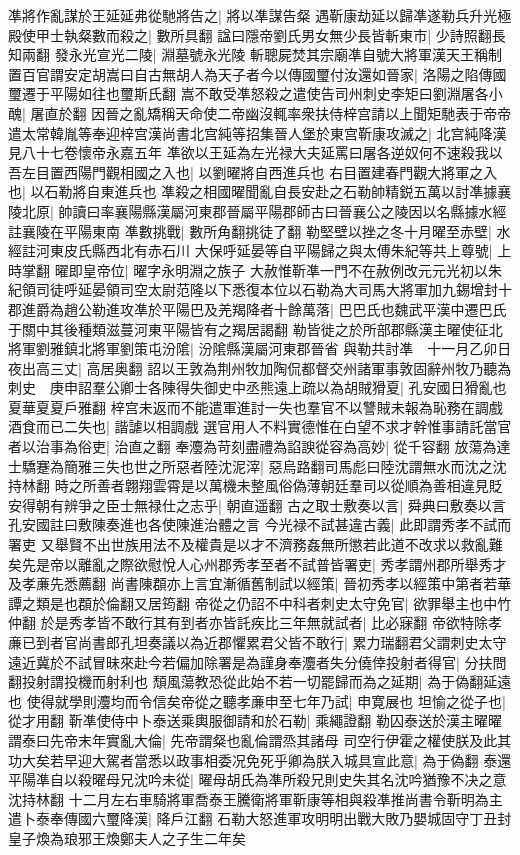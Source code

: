 凖將作亂謀於王延延弗從馳將告之|{
	將以凖謀告粲}
遇靳康劫延以歸凖遂勒兵升光極殿使甲士執粲數而殺之|{
	數所具翻}
諡曰隱帝劉氏男女無少長皆斬東市|{
	少詩照翻長知兩翻}
發永光宣光二陵|{
	淵墓號永光陵}
斬聰屍焚其宗廟凖自號大將軍漢天王稱制置百官謂安定胡嵩曰自古無胡人為天子者今以傳國璽付汝還如晉家|{
	洛陽之陷傳國璽遷于平陽如往也璽斯氏翻}
嵩不敢受凖怒殺之遣使告司州刺史李矩曰劉淵屠各小醜|{
	屠直於翻}
因晉之亂矯稱天命使二帝幽沒輒率衆扶侍梓宫請以上聞矩馳表于帝帝遣太常韓胤等奉迎梓宫漢尚書北宫純等招集晉人堡於東宫靳康攻滅之|{
	北宫純降漢見八十七卷懷帝永嘉五年}
凖欲以王延為左光禄大夫延罵曰屠各逆奴何不速殺我以吾左目置西陽門觀相國之入也|{
	以劉曜將自西進兵也}
右目置建春門觀大將軍之入也|{
	以石勒將自東進兵也}
凖殺之相國曜聞亂自長安赴之石勒帥精鋭五萬以討凖據襄陵北原|{
	帥讀曰率襄陽縣漢屬河東郡晉屬平陽郡師古曰晉襄公之陵因以名縣據水經註襄陵在平陽東南}
凖數挑戰|{
	數所角翻挑徒了翻}
勒堅壁以挫之冬十月曜至赤壁|{
	水經註河東皮氏縣西北有赤石川}
大保呼延晏等自平陽歸之與太傅朱紀等共上尊號|{
	上時掌翻}
曜即皇帝位|{
	曜字永明淵之族子}
大赦惟靳凖一門不在赦例改元元光初以朱紀領司徒呼延晏領司空太尉范隆以下悉復本位以石勒為大司馬大將軍加九錫增封十郡進爵為趙公勒進攻凖於平陽巴及羌羯降者十餘萬落|{
	巴巴氏也魏武平漢中遷巴氏于關中其後種類滋蔓河東平陽皆有之羯居謁翻}
勒皆徙之於所部郡縣漢主曜使征北將軍劉雅鎮北將軍劉策屯汾隂|{
	汾隂縣漢屬河東郡晉省}
與勒共討凖　十一月乙卯日夜出高三丈|{
	高居奥翻}
詔以王敦為荆州牧加陶侃都督交州諸軍事敦固辭州牧乃聽為刺史　庚申詔羣公卿士各陳得失御史中丞熊遠上疏以為胡賊猾夏|{
	孔安國日猾亂也夏華夏夏戶雅翻}
梓宫未返而不能遣軍進討一失也羣官不以讐賊未報為恥務在調戲酒食而已二失也|{
	諧謔以相調戲}
選官用人不料實德惟在白望不求才幹惟事請託當官者以治事為俗吏|{
	治直之翻}
奉灋為苛刻盡禮為諂諛從容為高妙|{
	從千容翻}
放蕩為達士驕蹇為簡雅三失也世之所惡者陸沈泥滓|{
	惡烏路翻司馬彪曰陸沈謂無水而沈之沈持林翻}
時之所善者翺翔雲霄是以萬機未整風俗偽薄朝廷羣司以從順為善相違見貶安得朝有辨爭之臣士無禄仕之志乎|{
	朝直遥翻}
古之取士敷奏以言|{
	舜典曰敷奏以言孔安國註曰敷陳奏進也各使陳進治體之言}
今光禄不試甚違古義|{
	此即謂秀孝不試而署吏}
又舉賢不出世族用法不及權貴是以才不濟務姦無所懲若此道不改求以救亂難矣先是帝以離亂之際欲慰悅人心州郡秀孝至者不試普皆署吏|{
	秀孝謂州郡所舉秀才及孝亷先悉薦翻}
尚書陳頵亦上言宜漸循舊制試以經策|{
	晉初秀孝以經策中第者若華譚之類是也頵於倫翻又居筠翻}
帝從之仍詔不中科者刺史太守免官|{
	欲罪舉主也中竹仲翻}
於是秀孝皆不敢行其有到者亦皆託疾比三年無就試者|{
	比必寐翻}
帝欲特除孝亷已到者官尚書郎孔坦奏議以為近郡懼累君父皆不敢行|{
	累力瑞翻君父謂刺史太守}
遠近冀於不試冒昧來赴今若偏加除署是為謹身奉灋者失分僥倖投射者得官|{
	分扶問翻投射謂投機而射利也}
頹風蕩教恐從此始不若一切罷歸而為之延期|{
	為于偽翻延遠也}
使得就學則灋均而令信矣帝從之聽孝亷申至七年乃試|{
	申寛展也}
坦愉之從子也|{
	從才用翻}
靳凖使侍中卜泰送乘輿服御請和於石勒|{
	乘繩證翻}
勒囚泰送於漢主曜曜謂泰曰先帝末年實亂大倫|{
	先帝謂粲也亂倫謂烝其諸母}
司空行伊霍之權使朕及此其功大矣若早迎大駕者當悉以政事相委况免死乎卿為朕入城具宣此意|{
	為于偽翻}
泰還平陽凖自以殺曜母兄沈吟未從|{
	曜母胡氏為凖所殺兄則史失其名沈吟猶豫不决之意沈持林翻}
十二月左右車騎將軍喬泰王騰衛將軍靳康等相與殺凖推尚書令靳明為主遣卜泰奉傳國六璽降漢|{
	降戶江翻}
石勒大怒進軍攻明明出戰大敗乃嬰城固守丁丑封皇子煥為琅邪王煥鄭夫人之子生二年矣

